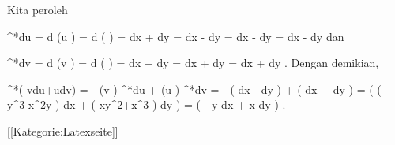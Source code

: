 Kita peroleh

\mavergleichskettealign
{\vergleichskettealign
{ \pi^*du
}
{ =} { d (u \circ \pi)
}
{ =} { d   \left(  {  }  \right)
}
{ =} { {  }   dx + {  } dy
}
{ =} { {  }  dx   - {  }  dy
}
}
{
\vergleichskettefortsetzungalign
{ =} { {  }  dx  - {  }  dy
}
{ =} { {  }  dx  - {  }  dy
}
{ } {}
{ } {}
}
{}{}
dan

\mavergleichskettealign
{\vergleichskettealign
{ \pi^*dv
}
{ =} { d (v \circ \pi)
}
{ =} { d \left(  {  }  \right)
}
{ =} { {  } dx + {  } dy
}
{ =} { {  } dx + {  } dy
}
}
{
\vergleichskettefortsetzungalign
{ =} { {  } dx + {  }  dy
}
{ } {
}
{ } {}
{ } {}
}
{}{.}
Dengan demikian,

\mavergleichskettealigndrucklinks
{\vergleichskettealigndrucklinks
{ \pi^*(-vdu+udv)
}
{ =} { - (v \circ \pi)  \pi^*du + (u \circ \pi) \pi^*dv
}
{ =} { - {  } \left(  {  }  dx  - {  }  dy   \right) + {  }  \left(  {  } dx + {  } dy  \right)
}
{ =} { {  }  \left(  \left(  -y^3-x^2y  \right) dx + \left(  xy^2+x^3  \right) dy \right)
}
{ =} { {  }  \left(  -  y dx + x dy \right)
}
}
{}{}{.}

 [[Kategorie:Latexseite]]
